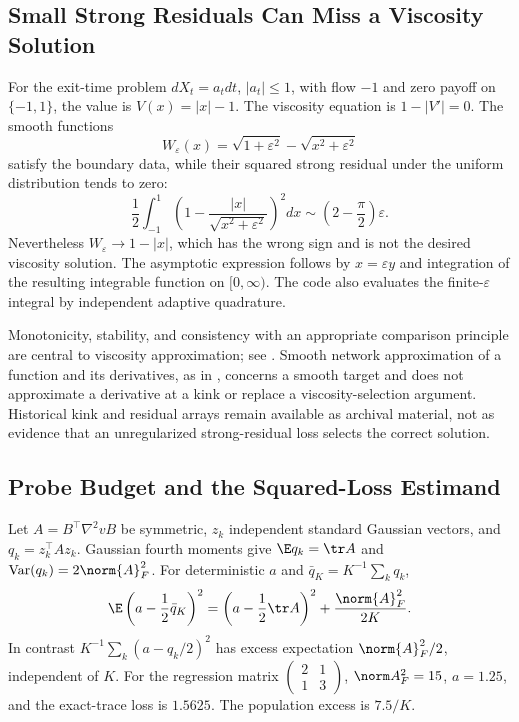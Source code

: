 \subsection{Small Strong Residuals Can Miss a Viscosity Solution}
For the exit-time problem $dX_t=a_tdt$, $|a_t|\leq1$, with flow $-1$ and zero payoff on $\{-1,1\}$, the value is $V(x)=|x|-1$. The viscosity equation is $1-|V'|=0$. The smooth functions
\[
 W_\varepsilon(x)=\sqrt{1+\varepsilon^2}-\sqrt{x^2+\varepsilon^2}
\]
satisfy the boundary data, while their squared strong residual under the uniform distribution tends to zero:
\[
 \frac12\int_{-1}^1\left(1-\frac{|x|}{\sqrt{x^2+\varepsilon^2}}\right)^2dx
 \sim\left(2-\frac\pi2\right)\varepsilon.
\]
Nevertheless $W_\varepsilon\to1-|x|$, which has the wrong sign and is not the desired viscosity solution. The asymptotic expression follows by $x=\varepsilon y$ and integration of the resulting integrable function on $[0,\infty)$. The code also evaluates the finite-$\varepsilon$ integral by independent adaptive quadrature.

Monotonicity, stability, and consistency with an appropriate comparison principle are central to viscosity approximation; see \citet{barles1991}. Smooth network approximation of a function and its derivatives, as in \citet{hornik1990}, concerns a smooth target and does not approximate a derivative at a kink or replace a viscosity-selection argument. Historical kink and residual arrays remain available as archival material, not as evidence that an unregularized strong-residual loss selects the correct solution.

\subsection{Probe Budget and the Squared-Loss Estimand}
Let $A=B^\top\nabla^2v B$ be symmetric, $z_k$ independent standard Gaussian vectors, and $q_k=z_k^\top A z_k$. Gaussian fourth moments give $\E q_k=\tr A$ and $\operatorname{Var}(q_k)=2\norm{A}_F^2$. For deterministic $a$ and $\bar q_K=K^{-1}\sum_kq_k$,
\[
 \E\left(a-\frac12\bar q_K\right)^2
 =\left(a-\frac12\tr A\right)^2+\frac{\norm{A}_F^2}{2K}.
\]
In contrast $K^{-1}\sum_k(a-q_k/2)^2$ has excess expectation $\norm{A}_F^2/2$, independent of $K$. For the regression matrix $\left(\begin{smallmatrix}2&1\\1&3\end{smallmatrix}\right)$, $\norm A_F^2=15$, $a=1.25$, and the exact-trace loss is $1.5625$. The population excess is $7.5/K$.

